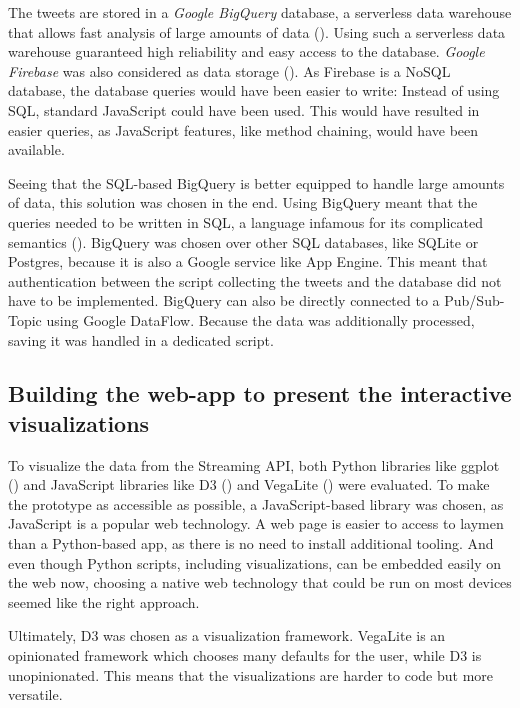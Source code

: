 The tweets are stored in a \emph{Google BigQuery} database, a serverless data warehouse that allows fast analysis of large amounts of data (\cite{googleBigQueryCloudData2020}). Using such a serverless data warehouse guaranteed high reliability and easy access to the database. \emph{Google Firebase} was also considered as data storage (\cite{googleCloudFirestoreFirebase2020}). As Firebase is a NoSQL database, the database queries would have been easier to write: Instead of using SQL, standard JavaScript could have been used. This would have resulted in easier queries, as JavaScript features, like method chaining, would have been available.

Seeing that the SQL-based BigQuery is better equipped to handle large amounts of data, this solution was chosen in the end. Using BigQuery meant that the queries needed to be written in SQL, a language infamous for its complicated semantics (\cite{slutz1998massive}). BigQuery was chosen over other SQL databases, like SQLite or Postgres, because it is also a Google service like App Engine. This meant that authentication between the script collecting the tweets and the database did not have to be implemented. BigQuery can also be directly connected to a Pub/Sub-Topic using Google DataFlow. Because the data was additionally processed, saving it was handled in a dedicated script. 

\subsection{Building the web-app to present the interactive visualizations}
To visualize the data from the Streaming API, both Python libraries like ggplot (\cite{wickhamGgplot2ElegantGraphics2016}) and JavaScript libraries like D3 (\cite{bostockD3JsDataDriven}) and VegaLite (\cite{uwidlVegaLiteHighLevelGrammar}) were evaluated. To make the prototype as accessible as possible, a JavaScript-based library was chosen, as JavaScript is a popular web technology. A web page is easier to access to laymen than a Python-based app, as there is no need to install additional tooling. And even though Python scripts, including visualizations, can be embedded easily on the web now, choosing a native web technology that could be run on most devices seemed like the right approach.

Ultimately, D3 was chosen as a visualization framework. VegaLite is an opinionated framework which chooses many defaults for the user, while D3 is unopinionated. This means that the visualizations are harder to code but more versatile.

